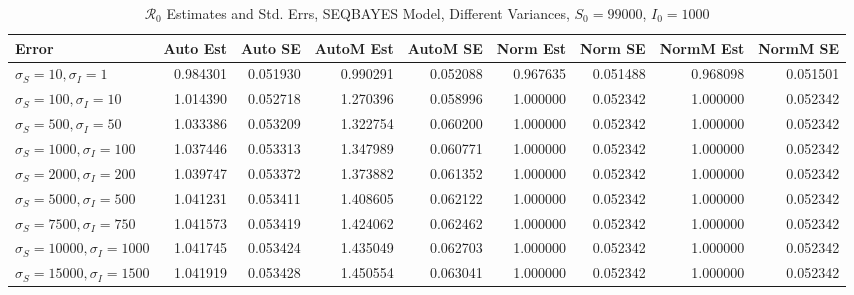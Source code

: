 \documentclass[12pt]{article}
\newcommand{\rr}{\ensuremath{\mathcal{R}_0}}
\begin{document}
\begin{table}[H]
	
	\caption{$\rr$ Estimates and Std. Errs, SEQBAYES Model, 
		Different Variances, $S_0 = 99000$, $I_0 = 1000$}
	\begin{footnotesize}
		\hskip -1.7cm
	\begin{tabular}{l|r|r|r|r|r|r|r|r}
		\hline
		Error & Auto Est & Auto SE & AutoM Est & AutoM SE & Norm Est & Norm SE & NormM Est & NormM SE\\
		\hline
		$\sigma_S = 10, \sigma_I = 1$ & 0.984301 & 0.051930 & 0.990291 & 0.052088 & 0.967635 & 0.051488 & 0.968098 & 0.051501\\
		\hline
		$\sigma_S = 100, \sigma_I = 10$ & 1.014390 & 0.052718 & 1.270396 & 0.058996 & 1.000000 & 0.052342 & 1.000000 & 0.052342\\
		\hline
		$\sigma_S = 500, \sigma_I = 50$ & 1.033386 & 0.053209 & 1.322754 & 0.060200 & 1.000000 & 0.052342 & 1.000000 & 0.052342\\
		\hline
		$\sigma_S = 1000, \sigma_I = 100$ & 1.037446 & 0.053313 & 1.347989 & 0.060771 & 1.000000 & 0.052342 & 1.000000 & 0.052342\\
		\hline
		$\sigma_S = 2000, \sigma_I = 200$ & 1.039747 & 0.053372 & 1.373882 & 0.061352 & 1.000000 & 0.052342 & 1.000000 & 0.052342\\
		\hline
		$\sigma_S = 5000, \sigma_I = 500$ & 1.041231 & 0.053411 & 1.408605 & 0.062122 & 1.000000 & 0.052342 & 1.000000 & 0.052342\\
		\hline
		$\sigma_S = 7500, \sigma_I = 750$ & 1.041573 & 0.053419 & 1.424062 & 0.062462 & 1.000000 & 0.052342 & 1.000000 & 0.052342\\
		\hline
		$\sigma_S = 10000, \sigma_I = 1000$ & 1.041745 & 0.053424 & 1.435049 & 0.062703 & 1.000000 & 0.052342 & 1.000000 & 0.052342\\
		\hline
		$\sigma_S = 15000, \sigma_I = 1500$ & 1.041919 & 0.053428 & 1.450554 & 0.063041 & 1.000000 & 0.052342 & 1.000000 & 0.052342\\
		\hline
	\end{tabular}
\end{footnotesize}
\end{table}
\end{document}
